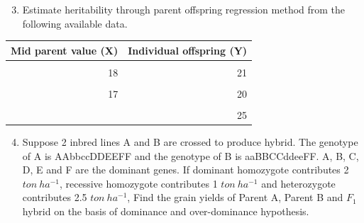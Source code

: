\documentclass[11pt,ignorenonframetext,aspectratio=169]{beamer}
\providecommand{\tightlist}{%
  \setlength{\itemsep}{0pt}\setlength{\parskip}{0pt}}
\begin{document}
\begin{frame}{}
\protect\hypertarget{section-15}{}
\begin{enumerate}
\setcounter{enumi}{2}
\tightlist
\item
  Estimate heritability through parent offspring regression method from
  the following available data.
\end{enumerate}

\begin{table}
\centering
\begin{tabular}{rr}
\toprule
Mid parent value (X) & Individual offspring (Y)\\
\midrule
\cellcolor{gray!6}{20} & \cellcolor{gray!6}{25}\\
18 & 21\\
\cellcolor{gray!6}{15} & \cellcolor{gray!6}{20}\\
17 & 20\\
\cellcolor{gray!6}{21} & \cellcolor{gray!6}{26}\\
\addlinespace
22 & 25\\
\bottomrule
\end{tabular}
\end{table}
\end{frame}

\begin{frame}{}
\protect\hypertarget{section-16}{}
\begin{enumerate}
\setcounter{enumi}{3}
\tightlist
\item
  Suppose 2 inbred lines A and B are crossed to produce hybrid. The
  genotype of A is AAbbccDDEEFF and the genotype of B is aaBBCCddeeFF.
  A, B, C, D, E and F are the dominant genes. If dominant homozygote
  contributes 2 \(ton~ha^{-1}\), recessive homozygote contributes 1
  \(ton~ha^{-1}\) and heterozygote contributes 2.5 \(ton~ha^{-1}\), Find
  the grain yields of Parent A, Parent B and \(F_1\) hybrid on the basis
  of dominance and over-dominance hypothesis.
\end{enumerate}
\end{frame}
\end{document}
